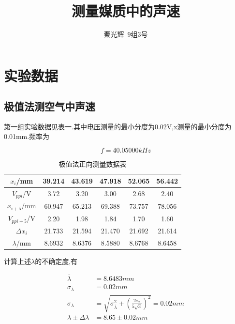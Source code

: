 \documentclass[a4paper,10pt,notitlepage]{article}
\begin{document}
\title{测量媒质中的声速}
\author{秦光辉\ 9组3号}
\maketitle

\section{实验数据}

\subsection{极值法测空气中声速}

	第一组实验数据见表一.其中电压测量的最小分度为0.02V,x测量的最小分度为0.01mm.频率为
	
\begin{equation}
	f = 40.05000 kHz
\end{equation}

\begin{table}[htbp]
\centering

	\begin{tabular}{|c|c|c|c|c|c|}
	\hline
	$x_{i}$/mm & 39.214 & 43.619 & 47.918 & 52.065 & 56.442 \\
	\hline
	$V_{ppi}$/V & 3.72 & 3.20 & 3.00 & 2.68 & 2.40 \\
	\hline
	$x_{i+5}$/mm & 60.947 & 65.213 & 69.388 & 73.757 & 78.056 \\
	\hline
	$V_{pp i+5}$/V & 2.20 & 1.98 & 1.84 & 1.70 & 1.60 \\
	\hline
	$\Delta x_i$ & 21.733 & 21.594 & 21.470 & 21.692 & 21.614 \\
	\hline
	$\lambda$/mm & 8.6932 & 8.6376 & 8.5880 & 8.6768 & 8.6458 \\
	\hline
	\end{tabular}
	\caption{极值法正向测量数据表}

\end{table}

	计算上述$\lambda$的不确定度,有 
	
\begin{align}
	\bar{\lambda} &= 8.6483mm \\
	\sigma_{\bar{\lambda}} &= 0.02 mm \\
	\sigma_\lambda &= \sqrt{\sigma_{\bar{\lambda}} ^ 2 + (\frac{2e_x}{5\sqrt{3}})^2}  = 0.02mm \\
	\lambda \pm \Delta \lambda &= 8.65 \pm 0.02 mm
\end{align}
\end{document}
